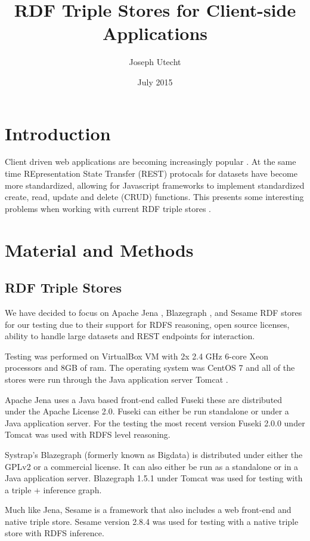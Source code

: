 \documentclass{article}
\title{RDF Triple Stores for Client-side Applications}
\author{Joseph Utecht}
\date{July 2015}
\begin{document}
\maketitle
\section{Introduction}

Client driven web applications are becoming increasingly popular \cite{Fielding2000}.  At the same time REpresentation State Transfer (REST) protocals for datasets have become more standardized, allowing for Javascript frameworks to implement standardized create, read, update and delete (CRUD) functions.  This presents some interesting problems when working with current RDF triple stores \cite{Battle2008}.

\section{Material and Methods}
\subsection{RDF Triple Stores}

We have decided to focus on Apache Jena \cite{Jena}, Blazegraph \cite{Blazegraph}, and Sesame \cite{Sesame} RDF stores for our testing due to their support for RDFS reasoning, open source licenses, ability to handle large datasets and REST endpoints for interaction. \cite{Voigt2012}

Testing was performed on VirtualBox VM \cite{Virtualbox} with 2x 2.4 GHz 6-core Xeon processors and 8GB of ram.  The operating system was CentOS 7 \cite{Centos} and all of the stores were run through the Java application server Tomcat \cite{Tomcat}.

Apache Jena uses a Java based front-end called Fuseki these are distributed under the Apache License 2.0.  Fuseki can either be run standalone or under a Java application server.  For the testing the most recent version Fuseki 2.0.0 under Tomcat was used with RDFS level reasoning.

Systrap's Blazegraph (formerly known as Bigdata) is distributed under either the GPLv2 or a commercial license.  It can also either be run as a standalone or in a Java application server.  Blazegraph 1.5.1 under Tomcat was used for testing with a triple + inference graph.

Much like Jena, Sesame is a framework that also includes a web front-end and native triple store.  Sesame version 2.8.4 was used for testing with a native triple store with RDFS inference.
\end{document}

